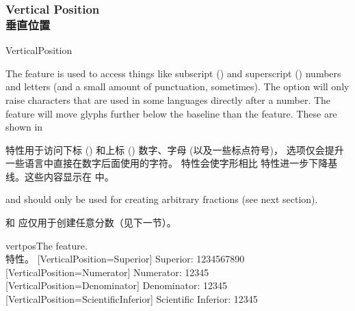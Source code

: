 \documentclass[a4paper]{l3doc}
\begin{document}
\subsubsection{Vertical Position\\垂直位置}

\begin{features}{VerticalPosition}
\end{features}

The  feature is used to access things like
subscript () and superscript () numbers and
letters (and a small amount of punctuation, sometimes).
The  option will only raise characters that are used
in some languages directly after a number.
The  feature will move glyphs
further below the baseline than the  feature.
These are shown in 

 特性用于访问下标 () 和上标 () 数字、字母 (以及一些标点符号)， 选项仅会提升一些语言中直接在数字后面使用的字符。 特性会使字形相比  特性进一步下降基线。这些内容显示在  中。

 and  should only be used for creating
arbitrary fractions (see next section).

 和  应仅用于创建任意分数（见下一节）。

\begin{Lexample}{vertpos}{The  feature.\\ 特性。}
  [VerticalPosition=Superior]
   Superior: 1234567890                                   \\
  [VerticalPosition=Numerator]
   Numerator: 12345                                       \\
  [VerticalPosition=Denominator]
   Denominator: 12345                                     \\
  [VerticalPosition=ScientificInferior]
   Scientific Inferior: 12345
\end{Lexample}
\end{document}
